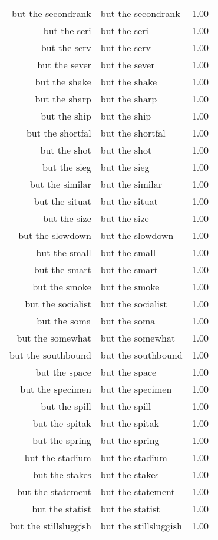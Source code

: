\begin{table}[ht]
\begin{tabular}{rlr}
  but the secondrank & but the secondrank & 1.00 \\ 
  but the seri & but the seri & 1.00 \\ 
  but the serv & but the serv & 1.00 \\ 
  but the sever & but the sever & 1.00 \\ 
  but the shake & but the shake & 1.00 \\ 
  but the sharp & but the sharp & 1.00 \\ 
  but the ship & but the ship & 1.00 \\ 
  but the shortfal & but the shortfal & 1.00 \\ 
  but the shot & but the shot & 1.00 \\ 
  but the sieg & but the sieg & 1.00 \\ 
  but the similar & but the similar & 1.00 \\ 
  but the situat & but the situat & 1.00 \\ 
  but the size & but the size & 1.00 \\ 
  but the slowdown & but the slowdown & 1.00 \\ 
  but the small & but the small & 1.00 \\ 
  but the smart & but the smart & 1.00 \\ 
  but the smoke & but the smoke & 1.00 \\ 
  but the socialist & but the socialist & 1.00 \\ 
  but the soma & but the soma & 1.00 \\ 
  but the somewhat & but the somewhat & 1.00 \\ 
  but the southbound & but the southbound & 1.00 \\ 
  but the space & but the space & 1.00 \\ 
  but the specimen & but the specimen & 1.00 \\ 
  but the spill & but the spill & 1.00 \\ 
  but the spitak & but the spitak & 1.00 \\ 
  but the spring & but the spring & 1.00 \\ 
  but the stadium & but the stadium & 1.00 \\ 
  but the stakes & but the stakes & 1.00 \\ 
  but the statement & but the statement & 1.00 \\ 
  but the statist & but the statist & 1.00 \\ 
  but the stillsluggish & but the stillsluggish & 1.00 \\ 

\end{tabular}
\end{table}
